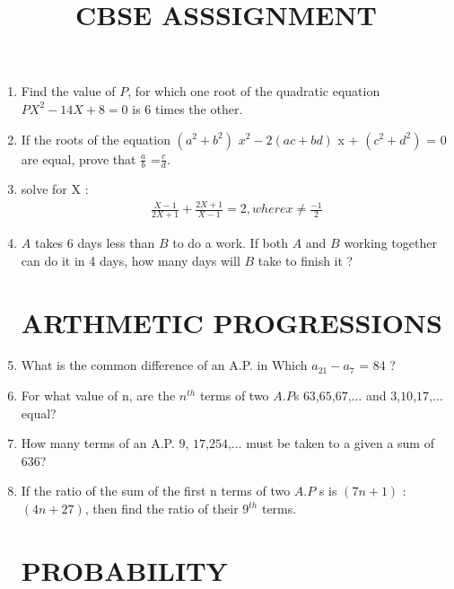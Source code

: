 \documentclass{article}
\title{CBSE ASSSIGNMENT}
\providecommand{\brak}[1]{\ensuremath{\left(#1\right)}}
\begin{document}
\maketitle
\begin{enumerate}
\section{QUADRATIC EQUATIONS}

\item Find the value of $P$, for which one root of the quadratic equation  $PX^{2} - 14X + 8 = 0 $ is $6$ times the other.

\item If the roots of the equation $\brak{a^2 + b^2}$ $x^{2} - 2\brak{ac + bd}$ x + $\brak{c^2 +d^2}$ = 0 are equal, prove that $\frac {a}  {b}$ =$\frac {c}  {d}$.

\item solve for X :
\begin{align*}
\frac{X-1}{2X+1}  +  \frac{2X+1}{X-1} =2 ,  where x  \neq  \frac{-1}{2}
\end{align*}

\item $A$ takes $6$ days less than $B$ to do a work. If both $A$ and $B$ working together can do it in 4 days, how many days will $B$ take to finish it ?




\section{ARTHMETIC PROGRESSIONS}

\item What is the common difference of an A.P. in Which $a_{21} - a_{7} $ = $84$ ? 

\item For what value of n, are the $n^{th}$ terms of two $A$.$P$s $63$,$65$,$67$,$\ldots$ and $3$,$10$,$17$,$\ldots$ equal?

\item How many terms of an A.P. $9$, $17$,$254$,$\ldots$ must be taken to a given a sum of $636$?

\item If the ratio of the sum of the first n terms of two $A$.$P$ s is $\brak { 7n +1 }$ : $\brak{4n + 27}$,
then find the ratio of their $9^{th}$ terms.



\section{PROBABILITY}


\end{enumerate}
\end{document}
